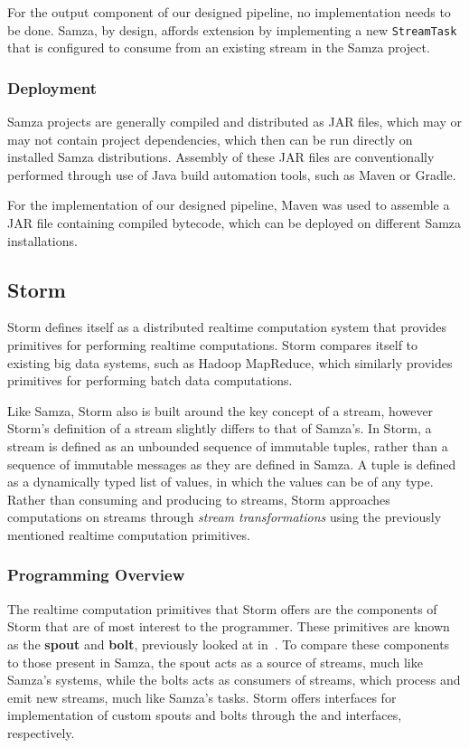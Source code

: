 For the output component of our designed pipeline, no implementation needs to be done. Samza, by design, affords extension
by implementing a new \texttt{StreamTask} that is configured to consume from an existing stream in the Samza project.

\subsubsection{Deployment}

Samza projects are generally compiled and distributed as JAR files, which may or may not contain project dependencies,
which then can be run directly on installed Samza distributions. Assembly of these JAR files are conventionally performed
through use of Java build automation tools, such as Maven or Gradle.

For the implementation of our designed pipeline, Maven was used to assemble a JAR file containing compiled bytecode, which can be deployed on different
Samza installations.



\subsection{Storm} %
\label{ssub:impl_storm}

Storm defines itself as a distributed realtime computation system that provides primitives for performing realtime
computations. Storm compares itself to existing big data systems, such as Hadoop MapReduce, which similarly provides
primitives for performing batch data computations.

Like Samza, Storm also is built around the key concept of a stream, however Storm's definition of a stream slightly
differs to that of Samza's. In Storm, a stream is defined as an unbounded sequence of immutable tuples, rather than a sequence
of immutable messages as they are defined in Samza. A tuple is defined as a dynamically typed list of values, in which
the values can be of any type. Rather than consuming and producing to streams, Storm approaches computations on streams
through \textit{stream transformations} using the previously mentioned realtime computation primitives.

\subsubsection{Programming Overview}

The realtime computation primitives that Storm offers are the components of Storm that are of most interest to the programmer.
These primitives are known as the \textbf{spout} and \textbf{bolt}, previously looked at in~. To compare
these components to those present in Samza, the spout acts as a source of streams, much like Samza's systems, while the
bolts acts as consumers of streams, which process and emit new streams, much like Samza's tasks. Storm offers interfaces
for implementation of custom spouts and bolts through the  and 
interfaces, respectively.

